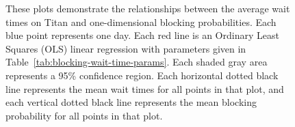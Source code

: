 \begin{figure}
  \vspace{1em}
  \caption{These plots demonstrate the relationships between the average wait
times on Titan and one-dimensional blocking probabilities. Each blue point
represents one day. Each red line is an Ordinary Least Squares (OLS) linear
regression with parameters given in Table~\ref{tab:blocking-wait-time-params}.
Each shaded gray area represents a 95\% confidence region. Each horizontal
dotted black line represents the mean wait times for all points in that plot,
and each vertical dotted black line represents the mean blocking probability
for all points in that plot.}
\end{figure}

